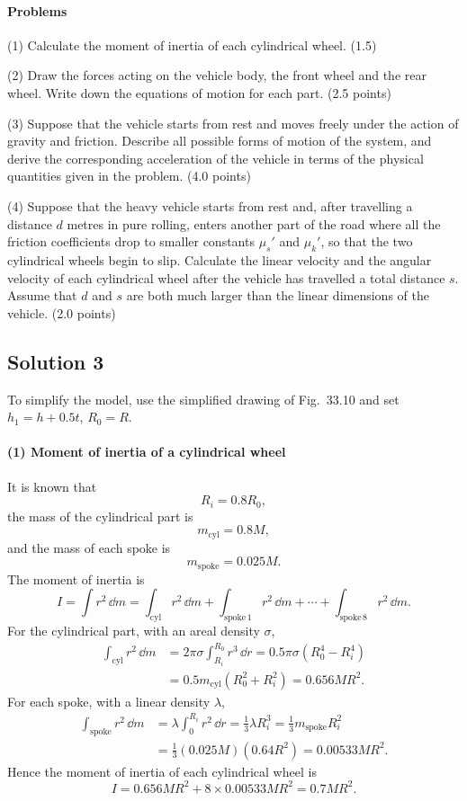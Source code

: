\paragraph{Problems}

(1) Calculate the moment of inertia of each cylindrical wheel. (1.5)

(2) Draw the forces acting on the vehicle body, the front wheel and the rear wheel. Write down the equations of motion for each part. (2.5 points)

(3) Suppose that the vehicle starts from rest and moves freely under the action of gravity and friction. Describe all possible forms of motion of the system, and derive the corresponding acceleration of the vehicle in terms of the physical quantities given in the problem. (4.0 points)

(4) Suppose that the heavy vehicle starts from rest and, after travelling a distance $d$ metres in pure rolling, enters another part of the road where all the friction coefficients drop to smaller constants $\mu_s'$ and $\mu_k'$, so that the two cylindrical wheels begin to slip. Calculate the linear velocity and the angular velocity of each cylindrical wheel after the vehicle has travelled a total distance $s$. Assume that $d$ and $s$ are both much larger than the linear dimensions of the vehicle. (2.0 points)

\subsection*{Solution 3}

To simplify the model, use the simplified drawing of Fig.~33.10 and set $h_1=h+0.5t$, $R_0=R$.

\paragraph{(1) Moment of inertia of a cylindrical wheel}

It is known that
\[
R_i=0.8R_0,
\]
the mass of the cylindrical part is
\[
m_{\text{cyl}}=0.8M,
\]
and the mass of each spoke is
\[
m_{\text{spoke}}=0.025M.
\]
The moment of inertia is
\[
I=\int r^2\,\dd m
=\int_{\text{cyl}}r^2\,\dd m+\int_{\text{spoke}\,1}r^2\,\dd m+\cdots+\int_{\text{spoke}\,8}r^2\,\dd m.
\]
For the cylindrical part, with an areal density $\sigma$,
\begin{align*}
\int_{\text{cyl}}r^2\,\dd m
&=2\pi\sigma\int_{R_i}^{R_0}r^3\,\dd r
=0.5\pi\sigma\left(R_0^4-R_i^4\right)\\
&=0.5m_{\text{cyl}}\left(R_0^2+R_i^2\right)=0.656MR^2.
\end{align*}
For each spoke, with a linear density $\lambda$,
\begin{align*}
\int_{\text{spoke}}r^2\,\dd m
&=\lambda\int_0^{R_i}r^2\,\dd r
=\frac{1}{3}\lambda R_i^3
=\frac{1}{3}m_{\text{spoke}}R_i^2\\
&=\frac{1}{3}(0.025M)(0.64R^2)=0.00533MR^2.
\end{align*}
Hence the moment of inertia of each cylindrical wheel is
\[
I=0.656MR^2+8\times0.00533MR^2=0.7MR^2.
\]

